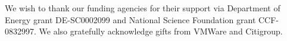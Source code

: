 \documentclass[9pt]{sigplanconf}
\begin{document}




\acks 
We wish to thank our funding agencies for their support via
Department of Energy grant DE-SC0002099 and National Science Foundation
grant CCF-0832997. We also gratefully acknowledge gifts from
VMWare and Citigroup.




%
\end{document}
